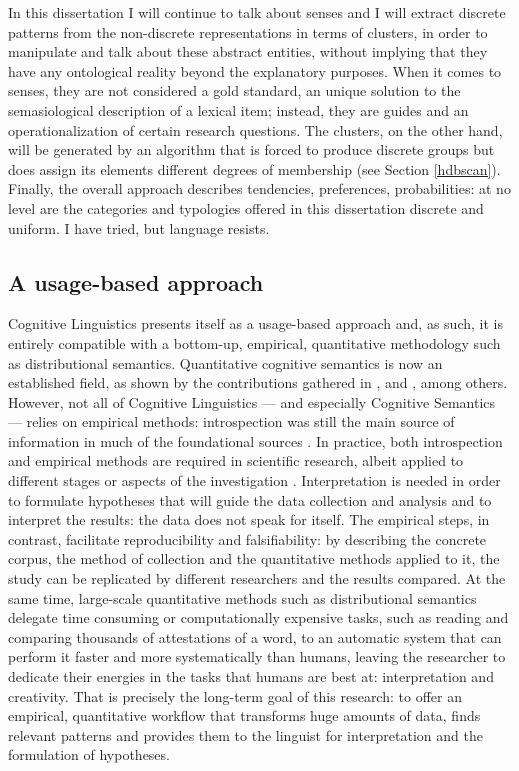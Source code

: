\documentclass[
]{book}
\begin{document}
In this dissertation I will continue to talk about senses and I will extract discrete patterns from the non-discrete representations in terms of clusters, in order to manipulate and talk about these abstract entities, without implying that they have any ontological reality beyond the explanatory purposes. When it comes to senses, they are not considered a gold standard, an unique solution to the semasiological description of a lexical item; instead, they are guides and an operationalization of certain research questions. The clusters, on the other hand, will be generated by an algorithm that is forced to produce discrete groups but does assign its elements different degrees of membership (see Section \ref{hdbscan}). Finally, the overall approach describes tendencies, preferences, probabilities: at no level are the categories and typologies offered in this dissertation discrete and uniform. I have tried, but language resists.

\hypertarget{a-usage-based-approach}{%
\subsection{A usage-based approach}\label{a-usage-based-approach}}

Cognitive Linguistics presents itself as a usage-based approach and, as such, it is entirely compatible with a bottom-up, empirical, quantitative methodology such as distributional semantics. Quantitative cognitive semantics is now an established field, as shown by the contributions gathered in \textcite{gries.stefanowitsch_2006}, \textcite{glynn.fischer_2010} and \textcite{glynn.robinson_2014}, among others. However, not all of Cognitive Linguistics --- and especially Cognitive Semantics --- relies on empirical methods: introspection was still the main source of information in much of the foundational sources \autocite[see for example the discussion illustrated in][]{geeraerts_1999}. In practice, both introspection and empirical methods are required in scientific research, albeit applied to different stages or aspects of the investigation \autocite{geeraerts_2010}.
Interpretation is needed in order to formulate hypotheses that will guide the data collection and analysis and to interpret the results: the data does not speak for itself. The empirical steps, in contrast, facilitate reproducibility and falsifiability: by describing the concrete corpus, the method of collection and the quantitative methods applied to it, the study can be replicated by different researchers and the results compared.
At the same time, large-scale quantitative methods such as distributional semantics delegate time consuming or computationally expensive tasks, such as reading and comparing thousands of attestations of a word, to an automatic system that can perform it faster and more systematically than humans, leaving the researcher to dedicate their energies in the tasks that humans are best at: interpretation and creativity. That is precisely the long-term goal of this research: to offer an empirical, quantitative workflow that transforms huge amounts of data, finds relevant patterns and provides them to the linguist for interpretation and the formulation of hypotheses.
\end{document}
